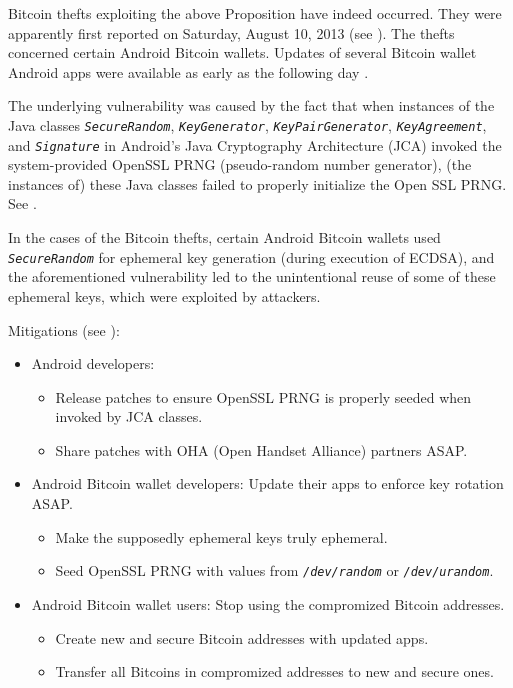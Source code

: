 \begin{remark}
\mbox{}
\vskip 0.1cm
\noindent
Bitcoin thefts exploiting the above Proposition have indeed occurred.
They were apparently first reported on Saturday, August 10, 2013
(see \cite{BitcoinTalk20130810}).
The thefts concerned certain Android Bitcoin wallets.
Updates of several Bitcoin wallet Android apps were available
as early as the following day \cite{BitcoinOrg20130811}.

The underlying vulnerability was caused by the fact that
when instances of the Java classes
\emph{\texttt{SecureRandom}}, \emph{\texttt{KeyGenerator}},
\emph{\texttt{KeyPairGenerator}}, \emph{\texttt{KeyAgreement}}, and
\emph{\texttt{Signature}} in Android's Java Cryptography Architecture (JCA)
invoked the system-provided OpenSSL PRNG
(pseudo-random number generator),
(the instances of) these Java classes failed to properly initialize
the Open SSL PRNG. See \cite{AndroidDev20130814}.

In the cases of the Bitcoin thefts, certain Android Bitcoin wallets used
\emph{\texttt{SecureRandom}} for ephemeral key generation
(during execution of ECDSA),
and the aforementioned vulnerability led to the unintentional reuse of some
of these ephemeral keys, which were exploited by attackers.

\vskip 0.3cm
\noindent
Mitigations (see \cite{AndroidDev20130814}):
\begin{itemize}
\item
	Android developers:
	\begin{itemize}
	\item
		Release patches to ensure OpenSSL PRNG is properly seeded
		when invoked by JCA classes.
	\item
		Share patches with OHA (Open Handset Alliance) partners ASAP.
	\end{itemize}
\item
	Android Bitcoin wallet developers: Update their apps to enforce key
	rotation ASAP.
	\begin{itemize}
	\item
		Make the supposedly ephemeral keys truly ephemeral.
	\item
		Seed OpenSSL PRNG with values from
		\emph{\texttt{/dev/random}} or \emph{\texttt{/dev/urandom}}.
	\end{itemize}
\item
	Android Bitcoin wallet users:
	Stop using the compromized Bitcoin addresses.
	\begin{itemize}
	\item
		Create new and secure Bitcoin addresses with updated apps.
	\item
		Transfer all Bitcoins in compromized addresses to new and secure ones.
	\end{itemize}
\end{itemize}
\end{remark}

